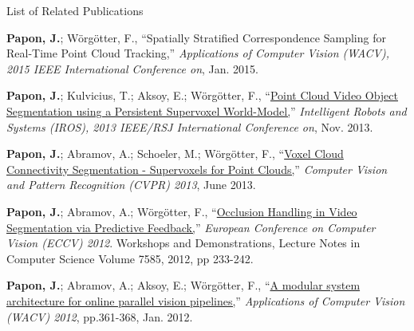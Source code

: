 
\noindent
\begin{flushright}
\huge List of Related Publications
\end{flushright} 
\vspace{50pt} 

\hangindent=1.5cm \textbf{Papon, J.};  Wörgötter, F., ``{Spatially Stratified Correspondence Sampling for Real-Time Point Cloud Tracking,}'' \emph{Applications of Computer Vision (WACV), 2015 IEEE International Conference on}, Jan. 2015. \\
\vspace{6pt}

\hangindent=1.5cm \textbf{Papon, J.};  Kulvicius, T.; Aksoy, E.; Wörgötter, F., ``\href{http://www.dpi.physik.uni-goettingen.de/cns/modules/BibtexModule/uploads/PDF/paponkulviciusaksoy2013.pdf}{Point Cloud Video Object Segmentation using a Persistent Supervoxel World-Model,}'' \emph{Intelligent Robots and Systems (IROS), 2013 IEEE/RSJ International Conference on}, Nov. 2013. \\
\vspace{6pt}

\hangindent=1.5cm \textbf{Papon, J.};  Abramov, A.; Schoeler, M.; Wörgötter, F., ``\href{http://www.cv-foundation.org/openaccess/content_cvpr_2013/papers/Papon_Voxel_Cloud_Connectivity_2013_CVPR_paper.pdf}{Voxel Cloud Connectivity Segmentation - Supervoxels for Point Clouds,}'' \emph{Computer Vision and Pattern Recognition (CVPR) 2013}, June 2013. \\
\vspace{6pt}

\hangindent=1.5cm \textbf{Papon, J.};  Abramov, A.; Wörgötter, F., ``\href{http://www.dpi.physik.uni-goettingen.de/cns/modules/BibtexModule/uploads/PDF/paponabramovwoergoetter2012.pdf}{Occlusion Handling in Video Segmentation via Predictive Feedback,}'' \emph{European Conference on Computer Vision (ECCV) 2012}. Workshops and Demonstrations, Lecture Notes in Computer Science Volume 7585, 2012, pp 233-242. \\
\vspace{6pt}

\hangindent=1.5cm \textbf{Papon, J.};  Abramov, A.; Aksoy, E.; Wörgötter, F., ``\href{http://www.dpi.physik.uni-goettingen.de/cns/modules/BibtexModule/uploads/PDF/paponabramovaksoy2012.pdf}{A modular system architecture for online parallel vision pipelines,}'' \emph{Applications of Computer Vision (WACV) 2012}, pp.361-368, Jan. 2012. \\
\vspace{6pt}

